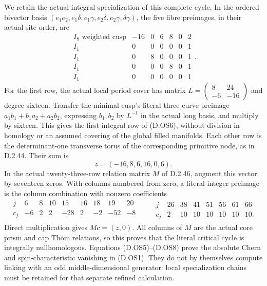We retain the actual integral specialization of this complete cycle.
In the ordered bivector basis
\((e_1e_2,e_1\delta,e_1\gamma,e_2\delta,e_2\gamma,\delta\gamma)\),
the five fibre preimages, in their actual site order, are
\[
 \begin{array}{c|rrrrrr}
 I_8\text{ weighted cusp}&-16&0&6&8&0&2\\
 I_1&0&0&0&0&0&1\\
 I_1&0&8&0&0&0&1\\
 I_1&0&0&0&8&0&1\\
 I_1&0&0&0&0&0&1
 \end{array}.                                             \tag{D.OS6}
\]
For the first row, the actual local period cover has matrix
\(L=\left(\begin{smallmatrix}8&24\\-6&-16\end{smallmatrix}\right)\)
and degree sixteen. Transfer the minimal cusp's literal
three-curve preimage
\(a_1b_1+b_1a_2+a_2b_2\), expressing \(b_1,b_2\) by \(L^{-1}\)
in the actual long basis, and multiply by sixteen. This gives
the first integral row of (D.OS6), without division in homology
or an assumed covering of the global filled manifolds.
Each other row is the determinant-one transverse torus of the
corresponding primitive node, as in D.2.44.
Their sum is
\[
                        z=(-16,8,6,16,0,6).              \tag{D.OS7}
\]
In the actual twenty-three-row relation matrix \(M\) of
D.2.46, augment this vector by seventeen zeros. With columns
numbered from zero, a literal integer preimage is the column
combination with nonzero coefficients
\[
 \begin{array}{c|rrrrrrrr}
 j&6&8&10&15&16&18&19&20\\\hline
 c_j&-6&2&2&-28&2&-2&-52&-8\\
 \end{array}
 \qquad
 \begin{array}{c|rrrrrrr}
 j&26&38&41&51&56&61&66\\\hline
 c_j&2&10&10&10&10&10&10 .
 \end{array}                                             \tag{D.OS8}
\]
Direct multiplication gives \(Mc=(z,0)\).
All columns of \(M\) are the actual core prism and cap Thom
relations, so this proves that the literal critical cycle is
integrally nullhomologous. Equations (D.OS5)--(D.OS8) prove
the absolute Chern and spin-characteristic vanishing in
(D.OS1). They do not by themselves compute linking with an
odd middle-dimensional generator: local specialization chains
must be retained for that separate refined calculation.


